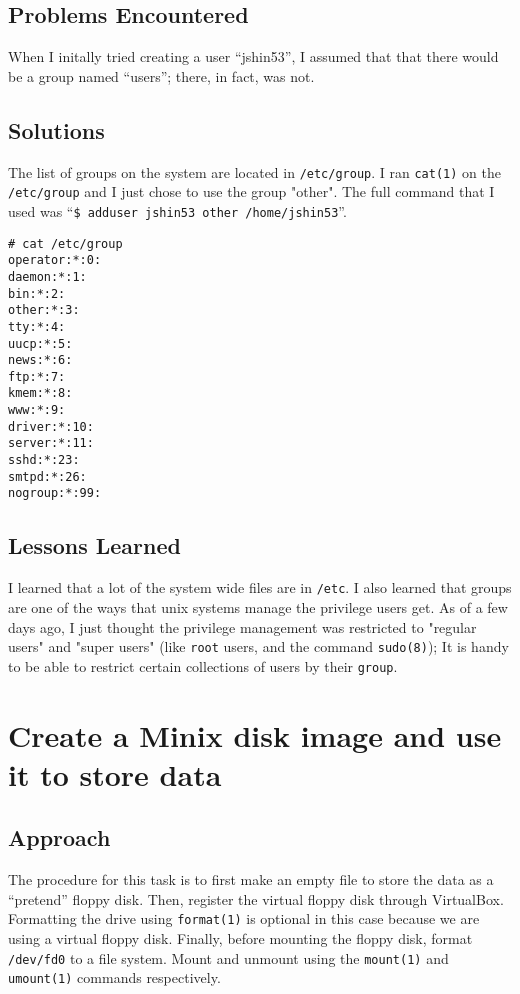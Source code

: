 \documentclass[11pt]{article}
\begin{document}
\subsection{Problems Encountered}
When I initally tried creating a user ``jshin53'', I assumed that that there would be a group named ``users''; there, in fact, was not.

\subsection{Solutions}
The list of groups on the system are located in {\tt /etc/group}. I ran {\tt cat(1)} on the {\tt /etc/group} and I just chose to use the group "other". The full command that I used was ``{\tt \$ adduser jshin53 other /home/jshin53}''.

\begin{verbatim}
# cat /etc/group
operator:*:0:
daemon:*:1:
bin:*:2:
other:*:3:
tty:*:4:
uucp:*:5:
news:*:6:
ftp:*:7:
kmem:*:8:
www:*:9:
driver:*:10:
server:*:11:
sshd:*:23:
smtpd:*:26:
nogroup:*:99:
\end{verbatim}

\subsection{Lessons Learned}
I learned that a lot of the system wide files are in {\tt /etc}. I also learned that groups are one of the ways that unix systems manage the privilege users get. As of a few days ago, I just thought the privilege management was restricted to "regular users" and "super users" (like {\tt root} users, and the command {\tt sudo(8)}); It is handy to be able to restrict certain collections of users by their {\tt group}.

\section{Create a {\sc Minix} disk image and use it to store data}
\subsection{Approach}
The procedure for this task is to first make an empty file to store the data as a ``pretend'' floppy disk. Then, register the virtual floppy disk through {\sc VirtualBox}. Formatting the drive using {\tt format(1)} is optional in this case because we are using a virtual floppy disk. Finally, before mounting the floppy disk, format {\tt /dev/fd0} to a file system. Mount and unmount using the {\tt mount(1)} and {\tt umount(1)} commands respectively.
\end{document}
